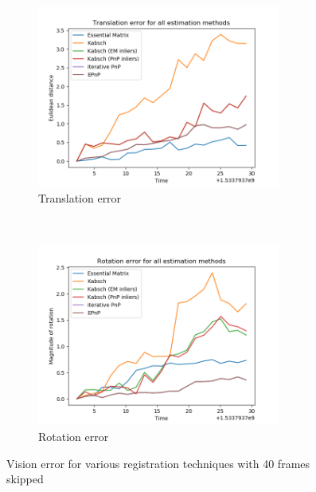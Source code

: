 \documentclass[12pt,a4paper]{article}
\begin{document}
\newpage
\begin{figure}[h]
  \begin{subfigure}[t]{0.5\textwidth}
  \centering
    \includegraphics[width=80mm]{../quad/basic-reg-saves/et_all_40.png}
    \caption{Translation error}
  \end{subfigure} %
  ~
  \begin{subfigure}[t]{0.5\textwidth}
    \includegraphics[width=80mm]{../quad/basic-reg-saves/eR_all_40.png}
    \caption{Rotation error}
  \end{subfigure}
  \caption{Vision error for various registration techniques with 40 frames skipped}
  \label{f: quad3 error}
\end{figure}
\end{document}
